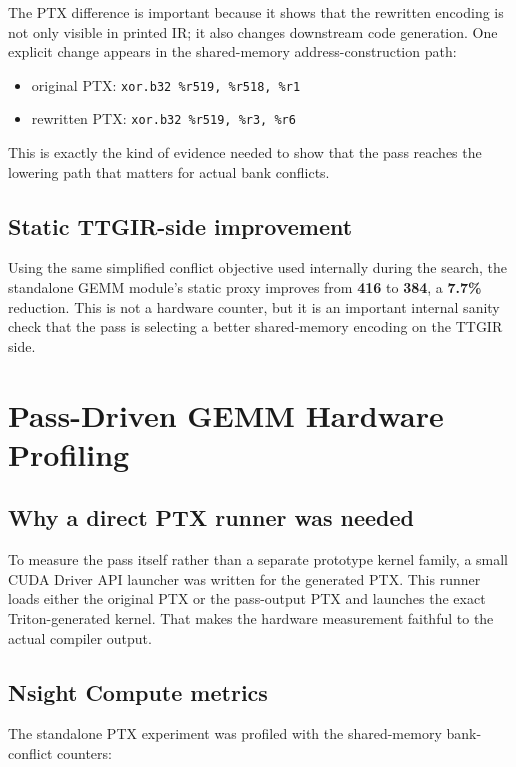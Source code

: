 \documentclass[11pt,a4paper]{article}
\begin{document}
The PTX difference is important because it shows that the rewritten encoding is
not only visible in printed IR; it also changes downstream code generation.
One explicit change appears in the shared-memory address-construction path:

\begin{itemize}
\item original PTX:
      \texttt{xor.b32 \%r519, \%r518, \%r1}
\item rewritten PTX:
      \texttt{xor.b32 \%r519, \%r3, \%r6}
\end{itemize}

This is exactly the kind of evidence needed to show that the pass reaches the
lowering path that matters for actual bank conflicts.

\subsection{Static TTGIR-side improvement}

Using the same simplified conflict objective used internally during the search,
the standalone GEMM module's static proxy improves from \textbf{416} to
\textbf{384}, a \textbf{7.7\%} reduction.  This is not a hardware counter, but
it is an important internal sanity check that the pass is selecting a better
shared-memory encoding on the TTGIR side.

\section{Pass-Driven GEMM Hardware Profiling}

\subsection{Why a direct PTX runner was needed}

To measure the pass itself rather than a separate prototype kernel family, a
small CUDA Driver API launcher was written for the generated PTX.  This runner
loads either the original PTX or the pass-output PTX and launches the exact
Triton-generated kernel.  That makes the hardware measurement faithful to the
actual compiler output.

\subsection{Nsight Compute metrics}

The standalone PTX experiment was profiled with the shared-memory bank-conflict
counters:
\end{document}
